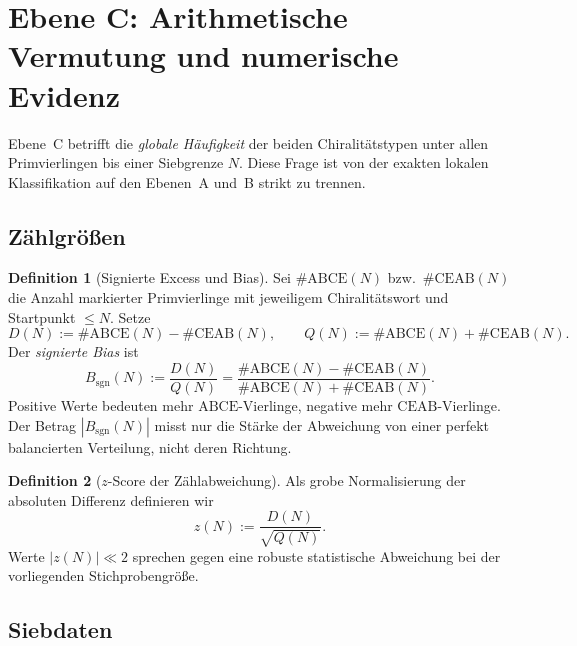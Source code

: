 \documentclass[11pt,a4paper]{article}
\theoremstyle{definition}
\newtheorem{definition}{Definition}[section]
\theoremstyle{plain}
\begin{document}
	\section{Ebene C: Arithmetische Vermutung und numerische Evidenz}\label{sec:ebene-c}
	
	Ebene~C betrifft die \emph{globale Häufigkeit} der beiden Chiralitätstypen unter allen Primvierlingen bis einer Siebgrenze $N$. Diese Frage ist von der exakten lokalen Klassifikation auf den Ebenen~A und~B strikt zu trennen.
	
	\subsection{Zählgrößen}
	
	\begin{definition}[Signierte Excess und Bias]
		Sei $\#\mathrm{ABCE}(N)$ bzw.\ $\#\mathrm{CEAB}(N)$ die Anzahl markierter Primvierlinge mit jeweiligem Chiralitätswort und Startpunkt $\le N$. Setze
		\[
		D(N):=\#\mathrm{ABCE}(N)-\#\mathrm{CEAB}(N),\qquad
		Q(N):=\#\mathrm{ABCE}(N)+\#\mathrm{CEAB}(N).
		\]
		Der \emph{signierte Bias} ist
		\[
		B_{\mathrm{sgn}}(N):=\frac{D(N)}{Q(N)}=\frac{\#\mathrm{ABCE}(N)-\#\mathrm{CEAB}(N)}{\#\mathrm{ABCE}(N)+\#\mathrm{CEAB}(N)}.
		\]
		Positive Werte bedeuten mehr $\mathrm{ABCE}$-Vierlinge, negative mehr $\mathrm{CEAB}$-Vierlinge. Der Betrag $|B_{\mathrm{sgn}}(N)|$ misst nur die Stärke der Abweichung von einer perfekt balancierten Verteilung, nicht deren Richtung.
	\end{definition}
	
	\begin{definition}[$z$-Score der Zählabweichung]
		Als grobe Normalisierung der absoluten Differenz definieren wir
		\[
		z(N):=\frac{D(N)}{\sqrt{Q(N)}}.
		\]
		Werte $|z(N)|\ll 2$ sprechen gegen eine robuste statistische Abweichung bei der vorliegenden Stichprobengröße.
	\end{definition}
	
	\subsection{Siebdaten}
	
\end{document}
